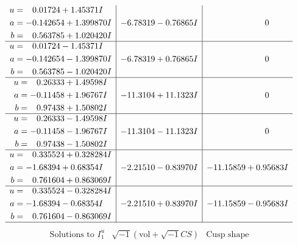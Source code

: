 \documentclass[1p]{elsarticle_modified}
\theoremstyle{definition}
\newcommand{\I}{\sqrt{-1}}
\begin{document}
$$\begin{array}{c|c|c}
\begin{aligned}
u &= \phantom{-}0.01724 + 1.45371 I \\
a &= -0.142654 + 1.399870 I \\
b &= \phantom{-}0.563785 + 1.020420 I\end{aligned}
 & -6.78319 - 0.76865 I & \phantom{-0.000000 } 0 \\ \hline\begin{aligned}
u &= \phantom{-}0.01724 - 1.45371 I \\
a &= -0.142654 - 1.399870 I \\
b &= \phantom{-}0.563785 - 1.020420 I\end{aligned}
 & -6.78319 + 0.76865 I & \phantom{-0.000000 } 0 \\ \hline\begin{aligned}
u &= \phantom{-}0.26333 + 1.49598 I \\
a &= -0.11458 + 1.96767 I \\
b &= \phantom{-}0.97438 + 1.50802 I\end{aligned}
 & -11.3104 + 11.1323 I & \phantom{-0.000000 } 0 \\ \hline\begin{aligned}
u &= \phantom{-}0.26333 - 1.49598 I \\
a &= -0.11458 - 1.96767 I \\
b &= \phantom{-}0.97438 - 1.50802 I\end{aligned}
 & -11.3104 - 11.1323 I & \phantom{-0.000000 } 0 \\ \hline\begin{aligned}
u &= \phantom{-}0.335524 + 0.328284 I \\
a &= -1.68394 + 0.68354 I \\
b &= \phantom{-}0.761604 + 0.863069 I\end{aligned}
 & -2.21510 - 0.83970 I & -11.15859 + 0.95683 I \\ \hline\begin{aligned}
u &= \phantom{-}0.335524 - 0.328284 I \\
a &= -1.68394 - 0.68354 I \\
b &= \phantom{-}0.761604 - 0.863069 I\end{aligned}
 & -2.21510 + 0.83970 I & -11.15859 - 0.95683 I\\
 \hline 
 \end{array}$$\newpage$$\begin{array}{c|c|c}  
\text{Solutions to }I^u_{1}& \I (\text{vol} + \sqrt{-1}CS) & \text{Cusp shape}\\
 \hline 
\begin{aligned}

\end{aligned}
\end{array}$$
\end{document}
